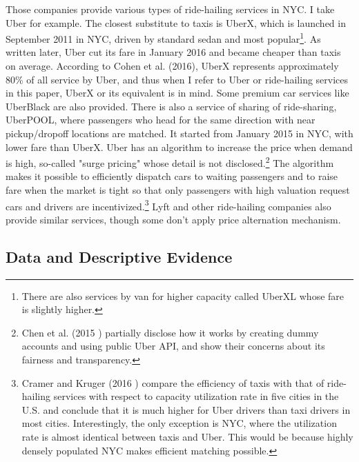 Those companies provide various types of ride-hailing services in NYC. I take Uber for example. The closest substitute to taxis is UberX, which is launched in September 2011 in NYC, driven by standard sedan and most popular\footnote{There are also services by van for higher capacity called UberXL whose fare is slightly higher.}. As written later, Uber cut its fare in January 2016 and became cheaper than taxis on average. According to Cohen et al. (2016), UberX represents approximately 80\% of all service by Uber, and thus when I refer to Uber or ride-hailing services in this paper, UberX or its equivalent is in mind. Some premium car services like UberBlack are also provided. There is also a service of sharing of ride-sharing, UberPOOL, where passengers who head for the same direction with near pickup/dropoff locations are matched. It started from January 2015 in NYC, with lower fare than UberX. Uber has an algorithm to increase the price when demand is high, so-called "surge pricing" whose detail is not disclosed.\footnote{Chen et al. (2015 \cite{chen2015peeking}) partially disclose how it works by creating dummy accounts and using public Uber API, and show their concerns about its fairness and transparency.} The algorithm makes it possible to efficiently dispatch cars to waiting passengers and to raise fare when the market is tight so that only passengers with high valuation request cars and drivers are incentivized.\footnote{Cramer and Kruger (2016 \cite{cramer2016disruptive}) compare the efficiency of taxis with that of ride-hailing services with respect to capacity utilization rate in five cities in the U.S. and conclude that it is much higher for Uber drivers than taxi drivers in most cities. Interestingly, the only exception is NYC, where the utilization rate is almost identical between taxis and Uber. This would be because highly densely populated NYC makes efficient matching possible.} Lyft and other ride-hailing companies also provide similar services, though some don't apply price alternation mechanism. 



\vspace{0.5cm}
\subsection{Data and Descriptive Evidence}
